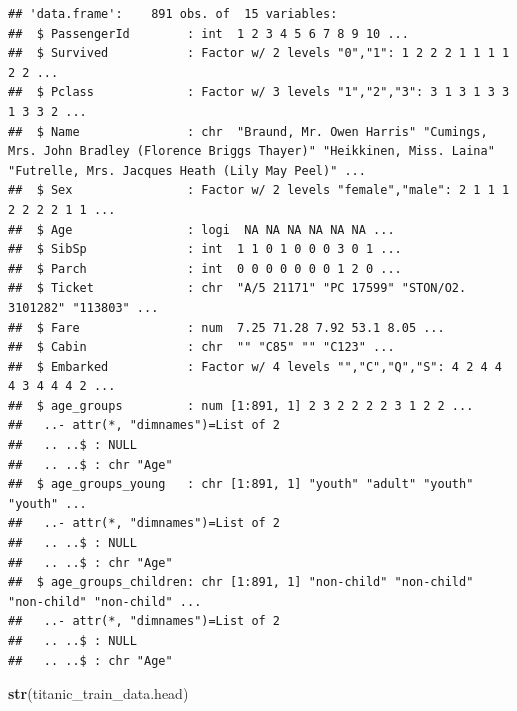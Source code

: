 \documentclass[
]{article}
\newenvironment{Shaded}{\begin{snugshade}}{\end{snugshade}}
\newcommand{\FunctionTok}[1]{\textcolor[rgb]{0.13,0.29,0.53}{\textbf{#1}}}
\newcommand{\NormalTok}[1]{#1}
\begin{document}
\begin{verbatim}
## 'data.frame':    891 obs. of  15 variables:
##  $ PassengerId        : int  1 2 3 4 5 6 7 8 9 10 ...
##  $ Survived           : Factor w/ 2 levels "0","1": 1 2 2 2 1 1 1 1 2 2 ...
##  $ Pclass             : Factor w/ 3 levels "1","2","3": 3 1 3 1 3 3 1 3 3 2 ...
##  $ Name               : chr  "Braund, Mr. Owen Harris" "Cumings, Mrs. John Bradley (Florence Briggs Thayer)" "Heikkinen, Miss. Laina" "Futrelle, Mrs. Jacques Heath (Lily May Peel)" ...
##  $ Sex                : Factor w/ 2 levels "female","male": 2 1 1 1 2 2 2 2 1 1 ...
##  $ Age                : logi  NA NA NA NA NA NA ...
##  $ SibSp              : int  1 1 0 1 0 0 0 3 0 1 ...
##  $ Parch              : int  0 0 0 0 0 0 0 1 2 0 ...
##  $ Ticket             : chr  "A/5 21171" "PC 17599" "STON/O2. 3101282" "113803" ...
##  $ Fare               : num  7.25 71.28 7.92 53.1 8.05 ...
##  $ Cabin              : chr  "" "C85" "" "C123" ...
##  $ Embarked           : Factor w/ 4 levels "","C","Q","S": 4 2 4 4 4 3 4 4 4 2 ...
##  $ age_groups         : num [1:891, 1] 2 3 2 2 2 2 3 1 2 2 ...
##   ..- attr(*, "dimnames")=List of 2
##   .. ..$ : NULL
##   .. ..$ : chr "Age"
##  $ age_groups_young   : chr [1:891, 1] "youth" "adult" "youth" "youth" ...
##   ..- attr(*, "dimnames")=List of 2
##   .. ..$ : NULL
##   .. ..$ : chr "Age"
##  $ age_groups_children: chr [1:891, 1] "non-child" "non-child" "non-child" "non-child" ...
##   ..- attr(*, "dimnames")=List of 2
##   .. ..$ : NULL
##   .. ..$ : chr "Age"
\end{verbatim}

\begin{Shaded}
\begin{Highlighting}[]
\FunctionTok{str}\NormalTok{(titanic\_train\_data.head)}
\end{Highlighting}
\end{Shaded}
\end{document}

